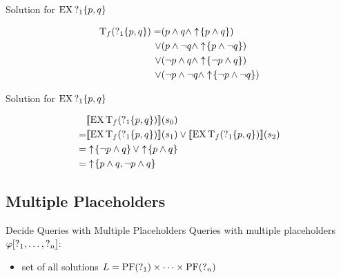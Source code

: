 \begin{frame}{Solution for $\operatorname{EX} \operatorname{?}_1\{p,q\}$}
  \begin{example}
    \begin{align*}
      \operatorname{T}_f( \operatorname{?}_1\{p,q\}) 
        =   &(p \land q \land \uparrow \! \left\{ p\land q \right\}) \\
        \lor&(p \land \lnot q \land \uparrow \! \left\{ p\land \lnot q \right\}) \\
        \lor&(\lnot p \land q \land \uparrow \! \left\{ \lnot p\land q \right\}) \\
        \lor&(\lnot p \land \lnot q \land \uparrow \! \left\{ \lnot p\land \lnot q \right\})
    \end{align*}
  \end{example}
\end{frame}

\begin{frame}{Solution for $\operatorname{EX} \operatorname{?}_1\{p,q\}$}
  \begin{example}
    \begin{align*}
      & \llbracket \operatorname{EX} \operatorname{T}_f( \operatorname{?}_1\{p,q\}) \rrbracket (s_0) \\
        =& \llbracket \operatorname{EX} \operatorname{T}_f( \operatorname{?}_1\{p,q\}) \rrbracket (s_1) \lor \llbracket \operatorname{EX} \operatorname{T}_f( \operatorname{?}_1\{p,q\}) \rrbracket (s_2) \\
        =& \uparrow \! \left\{ \lnot p\land q \right\} \lor \uparrow \! \left\{ p\land q \right\} \\
        =& \uparrow \! \left\{ p\land q, \lnot p\land q \right\} 
    \end{align*}
  \end{example}
\end{frame}

\subsection{Multiple Placeholders}%

\begin{frame}{Decide Queries with Multiple Placeholders}
  Queries with multiple placeholders $\varphi[\operatorname{?}_1,\ldots,\operatorname{?}_n]$:
  \begin{itemize}
    \item set of all solutions $L = \operatorname{PF}(\operatorname{?}_1)\times \cdots \times \operatorname{PF}(\operatorname{?}_n)$
  \end{itemize}
\end{frame}




